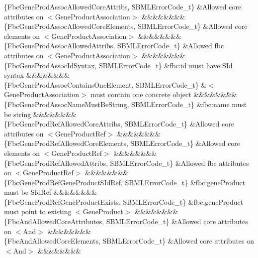 \begin{DoxyParagraph}{}
\begin{longtabu}
\{Fbc\+Gene\+Prod\+Assoc\+Allowed\+Core\+Attribs, S\+B\+M\+L\+Error\+Code\+\_\+t\} &Allowed core attributes on {\ttfamily $<$Gene\+Product\+Association$>$} &&&&&&&&\\
\{Fbc\+Gene\+Prod\+Assoc\+Allowed\+Core\+Elements, S\+B\+M\+L\+Error\+Code\+\_\+t\} &Allowed core elements on {\ttfamily $<$Gene\+Product\+Association$>$} &&&&&&&&\\
\{Fbc\+Gene\+Prod\+Assoc\+Allowed\+Attribs, S\+B\+M\+L\+Error\+Code\+\_\+t\} &Allowed fbc attributes on {\ttfamily $<$Gene\+Product\+Association$>$} &&&&&&&&\\
\{Fbc\+Gene\+Prod\+Assoc\+Id\+Syntax, S\+B\+M\+L\+Error\+Code\+\_\+t\} &\textquotesingle{}fbc\+:id\textquotesingle{} must have S\+Id syntax &&&&&&&&\\
\{Fbc\+Gene\+Prod\+Assoc\+Contains\+One\+Element, S\+B\+M\+L\+Error\+Code\+\_\+t\} &{\ttfamily $<$Gene\+Product\+Association$>$} must contain one concrete object &&&&&&&&\\
\{Fbc\+Gene\+Prod\+Assoc\+Name\+Must\+Be\+String, S\+B\+M\+L\+Error\+Code\+\_\+t\} &\textquotesingle{}fbc\+:name\textquotesingle{} must be string &&&&&&&&\\
\{Fbc\+Gene\+Prod\+Ref\+Allowed\+Core\+Attribs, S\+B\+M\+L\+Error\+Code\+\_\+t\} &Allowed core attributes on {\ttfamily $<$Gene\+Product\+Ref$>$} &&&&&&&&\\
\{Fbc\+Gene\+Prod\+Ref\+Allowed\+Core\+Elements, S\+B\+M\+L\+Error\+Code\+\_\+t\} &Allowed core elements on {\ttfamily $<$Gene\+Product\+Ref$>$} &&&&&&&&\\
\{Fbc\+Gene\+Prod\+Ref\+Allowed\+Attribs, S\+B\+M\+L\+Error\+Code\+\_\+t\} &Allowed fbc attributes on {\ttfamily $<$Gene\+Product\+Ref$>$} &&&&&&&&\\
\{Fbc\+Gene\+Prod\+Ref\+Gene\+Product\+S\+Id\+Ref, S\+B\+M\+L\+Error\+Code\+\_\+t\} &\textquotesingle{}fbc\+:gene\+Product\textquotesingle{} must be S\+Id\+Ref &&&&&&&&\\
\{Fbc\+Gene\+Prod\+Ref\+Gene\+Product\+Exists, S\+B\+M\+L\+Error\+Code\+\_\+t\} &\textquotesingle{}fbc\+:gene\+Product\textquotesingle{} must point to existing {\ttfamily $<$Gene\+Product$>$} &&&&&&&&\\
\{Fbc\+And\+Allowed\+Core\+Attributes, S\+B\+M\+L\+Error\+Code\+\_\+t\} &Allowed core attributes on {\ttfamily $<$And$>$} &&&&&&&&\\
\{Fbc\+And\+Allowed\+Core\+Elements, S\+B\+M\+L\+Error\+Code\+\_\+t\} &Allowed core attributes on {\ttfamily $<$And$>$} &&&&&&&&\\

\end{longtabu}
\end{DoxyParagraph}
